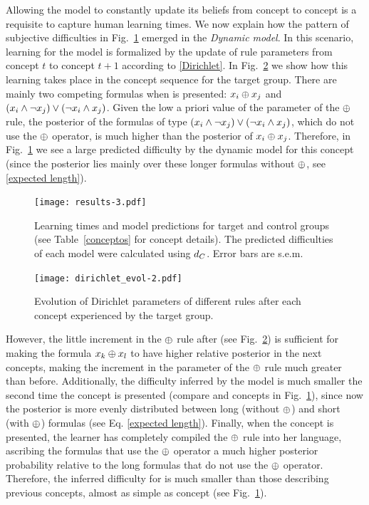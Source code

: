 Allowing the model to constantly update its beliefs from concept to concept is a requisite to capture human learning times. We now explain how the pattern of subjective difficulties in Fig.~\ref{results} emerged in the \textit{Dynamic model}. In this scenario, learning for the model is formalized by the update of rule parameters from concept $t$ to concept $t+1$ according to \eqref{Dirichlet}. In Fig.~\ref{evol} we show how this learning takes place in the concept sequence for the target group. There are mainly two competing formulas when \targetb is presented: $x_{i} \oplus x_{j}$ and $(x_{i} \wedge \neg x_{j}) \vee (\neg x_{i} \wedge x_{j})$. Given the low a priori value of the parameter of the $\oplus$ rule, the posterior of the formulas of type $(x_{i} \wedge \neg x_{j}) \vee (\neg x_{i} \wedge x_{j})$, which do not use the $\oplus$ operator, is much higher than the posterior of $x_{i} \oplus x_{j}$. Therefore, in Fig.~\ref{results} we see a large predicted difficulty by the dynamic model for this concept (since the posterior lies mainly over these longer formulas without $\oplus$, see  \eqref{expected length}). 

\begin{figure}
      \centering
      \texttt{[image: results-3.pdf]}
      \caption{Learning times and model predictions for target and control groups (see Table~\ref{conceptos} for concept details). The predicted difficulties of each model were calculated using $d_C$. Error bars are s.e.m.}
      \label{results}
\end{figure}

\begin{figure}
        \centering
        \texttt{[image: dirichlet\_evol-2.pdf]}
        \caption{Evolution of Dirichlet parameters of different rules after each concept experienced by the target group.}
       \label{evol}
\end{figure}


However, the little increment in the $\oplus$ rule after \targetb (see Fig.~\ref{evol}) is sufficient for making the formula $x_{k} \oplus x_{l}$ to have higher relative posterior in the next concepts, making the increment in the parameter of the $\oplus$ rule much greater than before. Additionally, the difficulty inferred by the model is much smaller the second time the concept is presented (compare \targetd and \targetb concepts in Fig.~\ref{results}), since now the posterior is more evenly distributed between long (without $\oplus$) and short (with $\oplus$) formulas (see Eq. \eqref{expected length}). Finally, when the concept \testa is presented, the learner has completely compiled the $\oplus$ rule into her language, ascribing the formulas that use the $\oplus$ operator a much higher posterior probability relative to the long formulas that do not use the $\oplus$ operator. Therefore, the inferred difficulty for \testa is much smaller than those describing previous concepts, almost as simple as concept \targeta (see Fig.~\ref{results}).


